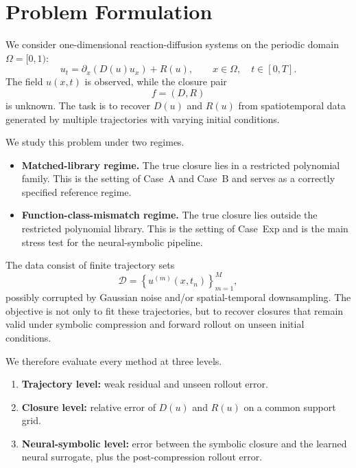 \section{Problem Formulation}

We consider one-dimensional reaction-diffusion systems on the periodic domain $\Omega = [0,1)$:
\begin{equation}
u_t = \partial_x \left( D(u) u_x \right) + R(u),
\qquad x \in \Omega, \quad t \in [0,T].
\end{equation}
The field $u(x,t)$ is observed, while the closure pair
\begin{equation}
f = (D,R)
\end{equation}
is unknown. The task is to recover $D(u)$ and $R(u)$ from spatiotemporal data generated by multiple trajectories with varying initial conditions.

We study this problem under two regimes.
\begin{itemize}[leftmargin=1.5em]
\item \textbf{Matched-library regime.} The true closure lies in a restricted polynomial family. This is the setting of Case~A and Case~B and serves as a correctly specified reference regime.
\item \textbf{Function-class-mismatch regime.} The true closure lies outside the restricted polynomial library. This is the setting of Case~Exp and is the main stress test for the neural-symbolic pipeline.
\end{itemize}

The data consist of finite trajectory sets
\begin{equation}
\mathcal{D} = \left\{ u^{(m)}(x,t_n) \right\}_{m=1}^{M}, 
\end{equation}
possibly corrupted by Gaussian noise and/or spatial-temporal downsampling. The objective is not only to fit these trajectories, but to recover closures that remain valid under symbolic compression and forward rollout on unseen initial conditions.

We therefore evaluate every method at three levels.
\begin{enumerate}[leftmargin=1.5em]
\item \textbf{Trajectory level:} weak residual and unseen rollout error.
\item \textbf{Closure level:} relative error of $D(u)$ and $R(u)$ on a common support grid.
\item \textbf{Neural-symbolic level:} error between the symbolic closure and the learned neural surrogate, plus the post-compression rollout error.
\end{enumerate}

